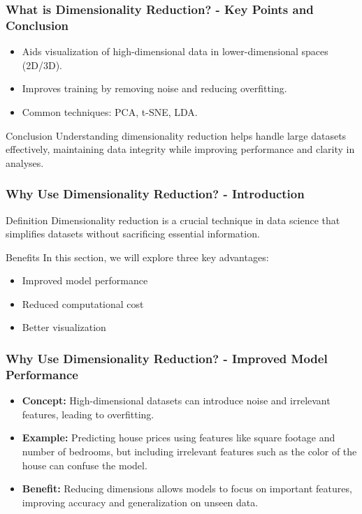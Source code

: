 \documentclass[aspectratio=169]{beamer}
\begin{document}
\begin{frame}[fragile]
    \frametitle{What is Dimensionality Reduction? - Key Points and Conclusion}
    \begin{itemize}
        \item Aids visualization of high-dimensional data in lower-dimensional spaces (2D/3D).
        \item Improves training by removing noise and reducing overfitting.
        \item Common techniques: PCA, t-SNE, LDA.
    \end{itemize}
    
    \begin{block}{Conclusion}
        Understanding dimensionality reduction helps handle large datasets effectively, maintaining data integrity while improving performance and clarity in analyses.
    \end{block}
\end{frame}

\begin{frame}[fragile]
    \frametitle{Why Use Dimensionality Reduction? - Introduction}
    \begin{block}{Definition}
        Dimensionality reduction is a crucial technique in data science that simplifies datasets without sacrificing essential information.
    \end{block}
    
    \begin{block}{Benefits}
        In this section, we will explore three key advantages:
        \begin{itemize}
            \item Improved model performance
            \item Reduced computational cost
            \item Better visualization
        \end{itemize}
    \end{block}
\end{frame}

\begin{frame}[fragile]
    \frametitle{Why Use Dimensionality Reduction? - Improved Model Performance}
    \begin{itemize}
        \item \textbf{Concept:} 
            High-dimensional datasets can introduce noise and irrelevant features, leading to overfitting.
        \item \textbf{Example:} 
            Predicting house prices using features like square footage and number of bedrooms, but including irrelevant features such as the color of the house can confuse the model.
        \item \textbf{Benefit:} 
            Reducing dimensions allows models to focus on important features, improving accuracy and generalization on unseen data.
    \end{itemize}
\end{frame}
\end{document}
